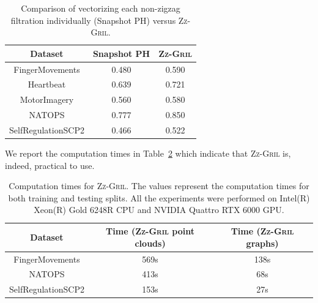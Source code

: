 \documentclass{article}
\newcommand{\zzgril}{\textsc{Zz-Gril}}
\theoremstyle{plain}
\theoremstyle{definition}
\theoremstyle{remark}
\begin{document}
\begin{table}[htbp]
    \centering
    \begin{tabular}{ccc}
    \toprule
        \textbf{Dataset} & \textbf{Snapshot PH}& \textbf{\zzgril}\\
        \midrule
         FingerMovements& 0.480& 0.590\\
 Heartbeat& 0.639&0.721\\
 MotorImagery& 0.560&0.580\\
         NATOPS &0.777& 0.850\\
         SelfRegulationSCP2 &0.466& 0.522\\
         \bottomrule
    \end{tabular}
    \caption{Comparison of vectorizing each non-zigzag filtration individually (Snapshot PH) versus \zzgril{}.}
    \label{tab:app:snapshot_ph_vs_zz}
\end{table}

 We report the computation times in Table~\ref{tab:app:comp_times} which indicate that \zzgril{} is, indeed, practical to use.

 \begin{table}[h!]
    \centering
    \begin{tabular}{ccc}
    \toprule
        \textbf{Dataset} & \textbf{Time (\zzgril{} point clouds)} & \textbf{Time (\zzgril{} graphs)}  \\
        \midrule
        FingerMovements &569s &138s \\
        NATOPS & 413s & 68s \\
        SelfRegulationSCP2 & 153s  & 27s \\
        \bottomrule
    \end{tabular}
    \caption{\small Computation times for \zzgril{}. The values represent the computation times for both training and testing splits. All the experiments were performed on Intel(R) Xeon(R) Gold 6248R CPU and NVIDIA Quattro RTX 6000 GPU.}
    \label{tab:app:comp_times}
\end{table}

\end{document}
